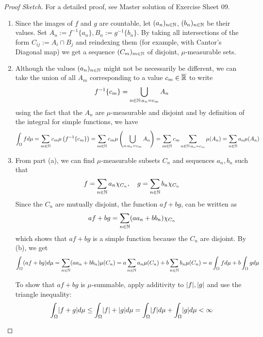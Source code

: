 \begin{proof}[Proof Sketch]
  For a detailed proof, see Master solution of Exercise Sheet 09.
  \begin{enumerate}
    \item Since the images of $f$ and $g$ are countable, let $(a_n)_{n \in \mathbb{N}}$, $(b_n)_{n \in  \mathbb{N}}$ be their values.
      Set $A_n := f^{-1}\{a_n\}, B_n := g^{-1}\{b_n\}$. 
      By taking all intersections of the form $C_{ij} := A_i \cap B_j$ and reindexing them (for example, with Cantor's Diagonal map) we get a sequence  $(C_m)_{m \in \mathbb{N}}$ of disjoint, $\mu$-measurable sets.
    \item Although the values $(a_n)_{n \in \mathbb{N}}$ might not be necessarily be different, we can take the union of all $A_m$ corresponding to a value $c_m \in \overline{\mathbb{R}}$ to write
      \begin{align*}
        f^{-1}\{c_m\} = \bigcup_{n \in \mathbb{N}: a_n = c_m} A_n
      \end{align*}
      using the fact that the $A_n$ are $\mu$-measurable and disjoint 
      and by definition of the integral for simple functions, we have
      \begin{align*}
        \int_{\Omega} f d \mu
        =
        \sum_{m \in \mathbb{N}} c_m \mu\left(
          f^{-1}\{c_m\}
        \right)
        =
        \sum_{m \in \mathbb{N}} c_m \mu\left(
          \bigcup_{n: a_n = c_m}A_n
        \right)
        =
        \sum_{m \in \mathbb{N}} c_m \sum_{n\in \mathbb{N}: a_n = c_m} \mu(A_n) 
        = 
        \sum_{n \in \mathbb{N}} a_n \mu(A_n)
      \end{align*}
    \item From part (a), we can find $\mu$-measurable subsets $C_n$ and sequences $a_n,b_n$ such that
      \begin{align*}
        f = \sum_{n \in \mathbb{N}}a_n \chi_{C_n}, \quad g = \sum_{n \in \mathbb{N}} b_n \chi_{C_n}
      \end{align*}
      Since the $C_n$ are mutually disjoint,
      the function $af + bg$, can be written as
      \begin{align*}
        af + bg = \sum_{n \in \mathbb{N}} (aa_n + bb_n)\chi_{C_n}
      \end{align*}
      which shows that $a f + bg$ is a simple function because the $C_n$ are disjoint.
      By (b), we get
      \begin{align*}
        \int_{\Omega} (af + bg) d \mu = \sum_{n \in \mathbb{N}} (aa_n + bb_n) \mu(C_n) = a\sum_{n \in \mathbb{N}}a_n \mu(C_n) + b\sum_{n \in \mathbb{N}} b_n \mu(C_n) = a\int_{\Omega} f d \mu + b\int_{\Omega} g d \mu
      \end{align*}

      To show that $a f + bg$ is $\mu$-summable, apply additivity to $\vert f\vert,\vert g\vert$ and use the triangle inequality:
      \begin{align*}
        \int_{\Omega} \abs{f+g} d \mu
        \leq
        \int_{\Omega} \abs{f} + \abs{g} d \mu
        = \int_{\Omega} \abs{f} d \mu + \int_{\Omega} \abs{g} d \mu < \infty
      \end{align*}
  \end{enumerate}
\end{proof}
